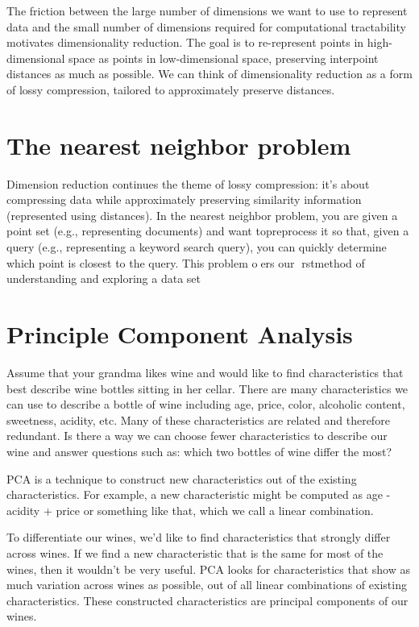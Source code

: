 \documentclass[openany]{book}
\begin{document}
The friction between the large number of dimensions we want to use to represent data and the small number of dimensions required for computational tractability motivates dimensionality reduction. The goal is to re-represent points in high-dimensional space as points in low-dimensional space, preserving interpoint distances as much as possible. We can think of dimensionality reduction as a form of lossy compression, tailored to approximately preserve distances. 


\section{The nearest neighbor problem}

Dimension reduction continues the theme of lossy compression:  it's about compressing data while approximately preserving similarity information (represented using distances). In the nearest neighbor  problem, you are given a point  set  (e.g.,  representing  documents) and want topreprocess it so that, given a query (e.g., representing a keyword search query), you can quickly determine which point is closest to the query.  This problem oers our rstmethod of understanding and exploring a data set




\section{Principle Component Analysis}

Assume that your grandma likes wine and would like to find characteristics that best describe wine bottles sitting in her cellar. There are many characteristics we can use to describe a bottle of wine including age, price, color, alcoholic content, sweetness, acidity, etc. Many of these characteristics are related and therefore redundant. Is there a way we can choose fewer characteristics to describe our wine and answer questions such as: which two bottles of wine differ the most?

PCA is a technique to construct new characteristics out of the existing characteristics. For example, a new characteristic might be computed as age - acidity + price or something like that, which we call a linear combination.

To differentiate our wines, we'd like to find characteristics that strongly differ across wines. If we find a new characteristic that is the same for most of the wines, then it wouldn't be very useful. PCA looks for characteristics that show as much variation across wines as possible, out of all linear combinations of existing characteristics. These constructed characteristics are principal components of our wines.
\end{document}
